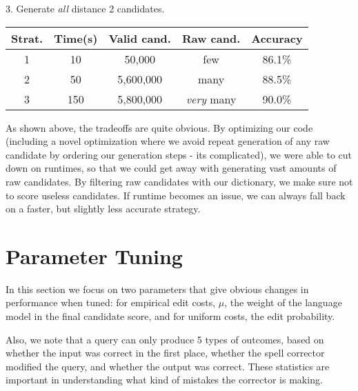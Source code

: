 \documentclass[10pt,twocolumn]{article}
\begin{document}
3. Generate {\it all} distance 2 candidates.

\begin{table}[ht]
\begin{tabular}{| c | c | c | c | c |}
\hline
Strat. & Time(s) & Valid cand. & Raw cand. & Accuracy\\\hline
1 & 10 & 50,000 & few & 86.1\%\\\hline
2 & 50 & 5,600,000 & many & 88.5\%\\\hline
3 & 150 & 5,800,000 & {\it very} many & 90.0\%\\\hline
\end{tabular}
\end{table}

As shown above, the tradeoffs are quite obvious. By optimizing our code (including a novel optimization where we avoid repeat generation of any raw candidate by ordering our generation steps - its complicated), we were able to cut down on runtimes, so that we could get away with generating vast amounts of raw candidates. By filtering raw candidates with our dictionary, we make sure not to score useless candidates. If runtime becomes an issue, we can always fall back on a faster, but slightly less accurate strategy.

\section{Parameter Tuning}
In this section we focus on two parameters that give obvious changes in performance when tuned: for empirical edit costs, $\mu$, the weight of the language model in the final candidate score, and for uniform costs, the edit probability.

Also, we note that a query can only produce 5 types of outcomes, based on whether the input was correct in the first place, whether the spell corrector modified the query, and whether the output was correct. These statistics are important in understanding what kind of mistakes the corrector is making.



\end{document}
